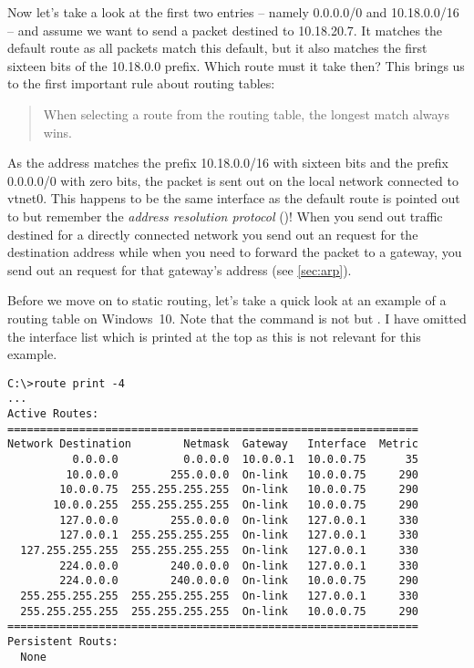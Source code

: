 Now let's take a look at the first two entries -- namely 0.0.0.0/0 and 10.18.0.0/16 -- and assume we want to send a packet destined to 10.18.20.7.
It matches the default route as all packets match this default, but it also matches the first sixteen bits of the 10.18.0.0 prefix.
Which route must it take then?
This brings us to the first important rule about routing tables:

\begin{quote}
   When selecting a route from the routing table, the longest match always wins.
\end{quote}

As the  address matches the prefix 10.18.0.0/16 with sixteen bits and the prefix 0.0.0.0/0 with zero bits, the packet is sent out on the local network connected to vtnet0.
This happens to be the same interface as the default route is pointed out to but remember the \emph{address resolution protocol} ()!
When you send out traffic destined for a directly connected network you send out an  request for the destination  address while when you need to forward the packet to a gateway, you send out an  request for that gateway's  address (see \vref{sec:arp}).

Before we move on to static routing, let's take a quick look at an example of a routing table on Windows~10.
Note that the command is not  but .
I have omitted the interface list which is printed at the top as this is not relevant for this example.

\begin{verbatim}
C:\>route print -4
...
Active Routes:
===============================================================
Network Destination        Netmask  Gateway   Interface  Metric
          0.0.0.0          0.0.0.0  10.0.0.1  10.0.0.75      35
         10.0.0.0        255.0.0.0  On-link   10.0.0.75     290
        10.0.0.75  255.255.255.255  On-link   10.0.0.75     290
       10.0.0.255  255.255.255.255  On-link   10.0.0.75     290
        127.0.0.0        255.0.0.0  On-link   127.0.0.1     330
        127.0.0.1  255.255.255.255  On-link   127.0.0.1     330
  127.255.255.255  255.255.255.255  On-link   127.0.0.1     330
        224.0.0.0        240.0.0.0  On-link   127.0.0.1     330
        224.0.0.0        240.0.0.0  On-link   10.0.0.75     290
  255.255.255.255  255.255.255.255  On-link   127.0.0.1     330
  255.255.255.255  255.255.255.255  On-link   10.0.0.75     290
===============================================================
Persistent Routs:
  None
\end{verbatim}




